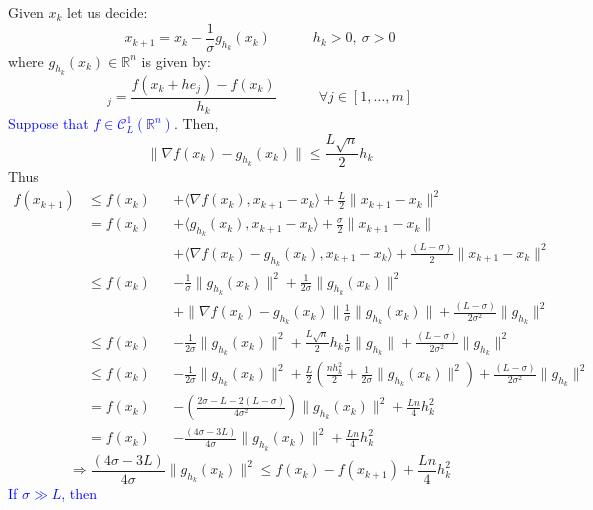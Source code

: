 \documentclass[12pt, openany]{report}
\newcommand{\R}{\mathbb{R}}
\newcommand{\C}{\mathcal{C}}
\theoremstyle{definition}
\begin{document}
Given $x_k$ let us decide:
\begin{equation}
	x_{k+1} = x_k - \frac{1}{\sigma} g_{h_k}(x_k) \quad \quad \quad h_k > 0, \: \sigma > 0
\end{equation}
where $g_{h_k}(x_k) \in \R^n$ is given by:
\begin{equation}
	[g_{h_k}(x_k)]_j = \frac{f(x_k+he_j)-f(x_k)}{h_k} \quad \quad \quad \forall j\in [1,\dots,m]
\end{equation}
\textcolor{blue}{Suppose that $f\in \C^1_L(\R^n)$}. Then,
\begin{equation}
	\|\nabla f(x_k) - g_{h_k}(x_k)\| \leq \frac{L \sqrt{n}}{2} h_k
\end{equation}
Thus 
\begin{equation}
	\begin{aligned}
		f(x_{k+1}) &\leq f(x_k) &&+ \langle \nabla f(x_k), x_{k+1}-x_k\rangle + \frac{L}{2}\lVert x_{k+1}-x_k\rVert^2\\
		&= f(x_k) &&+ \langle g_{h_k}(x_k), x_{k+1}-x_k\rangle + \frac{\sigma}{2} \|x_{k+1}-x_k\|\\
		& &&+ \langle \nabla f(x_k) - g_{h_k}(x_k), x_{k+1}-x_k\rangle + \frac{(L-\sigma)}{2}\lVert x_{k+1}-x_k\rVert^2\\
		&\leq f(x_k) &&- \frac{1}{\sigma} \|g_{h_k}(x_k)\|^2 + \frac{1}{2\sigma} \|g_{h_k}(x_k)\|^2 \\
		& &&+ \| \nabla f(x_k) - g_{h_k}(x_k)\| \frac{1}{\sigma} \|g_{h_k}(x_k)\| + \frac{(L-\sigma)}{2\sigma^2} \|g_{h_k}\|^2\\
		& \leq f(x_k) &&- \frac{1}{2\sigma} \|g_{h_k}(x_k)\|^2 + \frac{L \sqrt{n}}{2} h_k \frac{1}{\sigma} \|g_{h_k}\| + \frac{(L-\sigma)}{2\sigma^2} \|g_{h_k}\|^2\\
		&\leq f(x_k) &&- \frac{1}{2\sigma} \|g_{h_k}(x_k)\|^2 + \frac{L}{2} \left( \frac{nh_k^2}{2}+ \frac{1}{2 \sigma} \|g_{h_k}(x_k)\|^2 \right) + \frac{(L-\sigma)}{2\sigma^2} \|g_{h_k}\|^2\\
		&= f(x_k) &&- \left( \frac{2\sigma - L -2(L - \sigma)}{4 \sigma^2} \right) \|g_{h_k}(x_k)\|^2 + \frac{Ln}{4} h_k^2\\
		&= f(x_k) &&- \frac{(4\sigma -3L)}{4 \sigma} \|g_{h_k}(x_k)\|^2  + \frac{Ln}{4} h_k^2
	\end{aligned}
\end{equation}
\begin{equation}
	\Longrightarrow \frac{(4\sigma -3L)}{4 \sigma} \|g_{h_k}(x_k)\|^2 \leq f(x_k) - f(x_{k+1}) + \frac{Ln}{4} h_k^2
\end{equation}
\textcolor{blue}{If $\sigma \gg L$, then}
\end{document}
